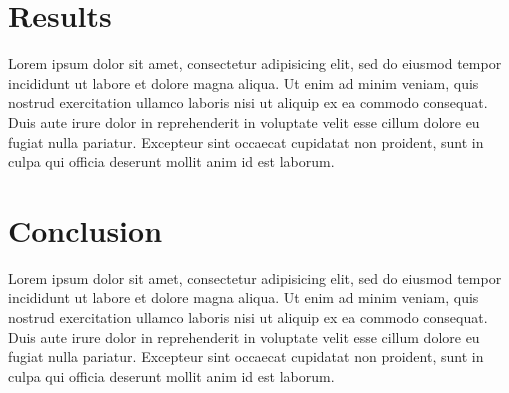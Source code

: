 \documentclass[a4paper, 12pt]{article}
\begin{document}
	\newpage
	\section{Results}
	Lorem ipsum dolor sit amet, consectetur adipisicing elit, sed do eiusmod
	tempor incididunt ut labore et dolore magna aliqua. Ut enim ad minim veniam,
	quis nostrud exercitation ullamco laboris nisi ut aliquip ex ea commodo
	consequat. Duis aute irure dolor in reprehenderit in voluptate velit esse
	cillum dolore eu fugiat nulla pariatur. Excepteur sint occaecat cupidatat non
	proident, sunt in culpa qui officia deserunt mollit anim id est laborum.

	\newpage
	\section{Conclusion}
	Lorem ipsum dolor sit amet, consectetur adipisicing elit, sed do eiusmod
	tempor incididunt ut labore et dolore magna aliqua. Ut enim ad minim veniam,
	quis nostrud exercitation ullamco laboris nisi ut aliquip ex ea commodo
	consequat. Duis aute irure dolor in reprehenderit in voluptate velit esse
	cillum dolore eu fugiat nulla pariatur. Excepteur sint occaecat cupidatat non
	proident, sunt in culpa qui officia deserunt mollit anim id est laborum.
\end{document}
